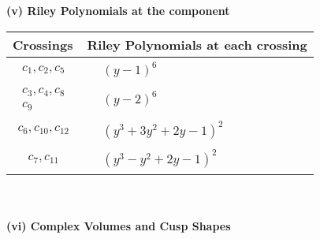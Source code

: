 \documentclass[1p]{elsarticle_modified}
\theoremstyle{definition}
\begin{document}
\newpage\renewcommand{\arraystretch}{1}
\flushleft \textbf{(v) Riley Polynomials at the component}\newline \\
\begin{tabular}{m{50pt}|m{274pt}}
Crossings & \hspace{64pt}Riley Polynomials at each crossing \\
\hline $$\begin{aligned}c_{1},c_{2},c_{5}\end{aligned}$$&$\begin{aligned}
&(y-1)^6
\end{aligned}$\\
\hline $$\begin{aligned}c_{3},c_{4},c_{8}\\c_{9}\end{aligned}$$&$\begin{aligned}
&(y-2)^6
\end{aligned}$\\
\hline $$\begin{aligned}c_{6},c_{10},c_{12}\end{aligned}$$&$\begin{aligned}
&(y^3+3 y^2+2 y-1)^2
\end{aligned}$\\
\hline $$\begin{aligned}c_{7},c_{11}\end{aligned}$$&$\begin{aligned}
&(y^3- y^2+2 y-1)^2
\end{aligned}$\\
\hline
\end{tabular}\\~\\
\newpage\flushleft \textbf{(vi) Complex Volumes and Cusp Shapes}
\end{document}
